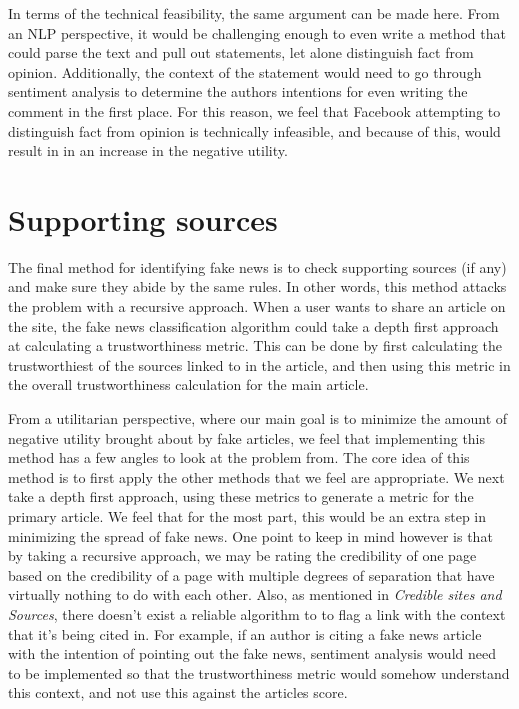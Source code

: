 \documentclass[12pt]{article}
\begin{document}
In terms of the technical feasibility, the same argument can be made here. From an NLP perspective, it would be challenging enough to even write a method that could parse the text and pull out statements, let alone distinguish fact from opinion. Additionally, the context of the statement would need to go through sentiment analysis to determine the authors intentions for even writing the comment in the first place. For this reason, we feel that Facebook attempting to distinguish fact from opinion is technically infeasible, and because of this, would result in in an increase in the negative utility.

\section{Supporting sources}
The final method for identifying fake news is to check supporting sources (if any) and make sure they abide by the same rules. In other words, this method attacks the problem with a recursive approach. When a user wants to share an article on the site, the fake news classification algorithm could take a depth first approach at calculating a trustworthiness metric. This can be done by first calculating the trustworthiest of the sources linked to in the article, and then using this metric in the overall trustworthiness calculation for the main article.

From a utilitarian perspective, where our main goal is to minimize the amount of negative utility brought about by fake articles, we feel that implementing this method has a few angles to look at the problem from. The core idea of this method is to first apply the other methods that we feel are appropriate. We next take a depth first approach, using these metrics to generate a metric for the primary article. We feel that for the most part, this would be an extra step in minimizing the spread of fake news. One point to keep in mind however is that by taking a recursive approach, we may be rating the credibility of one page based on the credibility of a page with multiple degrees of separation that have virtually nothing to do with each other. Also, as mentioned in \textit{Credible sites and Sources}, there doesn't exist a reliable algorithm to to flag a link with the context that it's being cited in. For example, if an author is citing a fake news article with the intention of pointing out the fake news, sentiment analysis would need to be implemented so that the trustworthiness metric would somehow understand this context, and not use this against the articles score.
\end{document}
